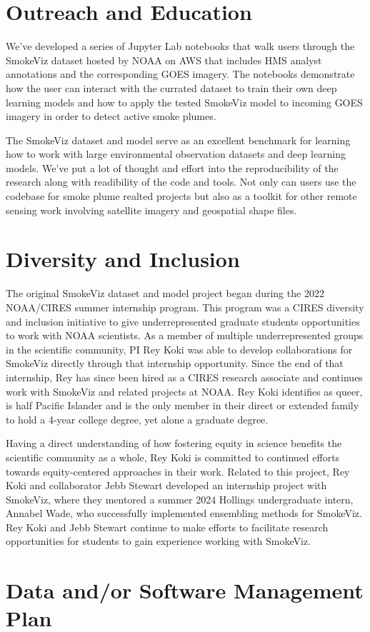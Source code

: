 \section{Outreach and Education}

We've developed a series of Jupyter Lab notebooks that walk users through the SmokeViz dataset hosted by NOAA on AWS that includes HMS analyst annotations and the corresponding GOES imagery. The notebooks demonstrate how the user can interact with the currated dataset to train their own deep learning models and how to apply the tested SmokeViz model to incoming GOES imagery in order to detect active smoke plumes.

The SmokeViz dataset and model serve as an excellent benchmark for learning how to work with large environmental observation datasets and deep learning models. We've put a lot of thought and effort into the reproducibility of the research along with readibility of the code and tools. Not only can users use the codebase for smoke plume realted projects but also as a toolkit for other remote sensing work involving satellite imagery and geospatial shape files. 



\section{Diversity and Inclusion}

The original SmokeViz dataset and model project began during the 2022 NOAA/CIRES summer internship program. This program was a CIRES diversity and inclusion initiative to give underrepresented graduate students opportunities to work with NOAA scientists. As a member of multiple underrepresented groups in the scientific community, PI Rey Koki was able to develop collaborations for SmokeViz directly through that internship opportunity. Since the end of that internship, Rey has since been hired as a CIRES research associate and continues work with SmokeViz and related projects at NOAA. Rey Koki identifies as queer, is half Pacific Islander and is the only member in their direct or extended family to hold a 4-year college degree, yet alone a graduate degree. 
 
Having a direct understanding of how fostering equity in science benefits the scientific community as a whole, Rey Koki is committed to continued efforts towards equity-centered approaches in their work. Related to this project, Rey Koki and collaborator Jebb Stewart developed an internship project with SmokeViz, where they mentored a summer 2024 Hollings undergraduate intern, Annabel Wade, who successfully implemented ensembling methods for SmokeViz. Rey Koki and Jebb Stewart continue to make efforts to facilitate research opportunities for students to gain experience working with SmokeViz.

\section{Data and/or Software Management Plan}


